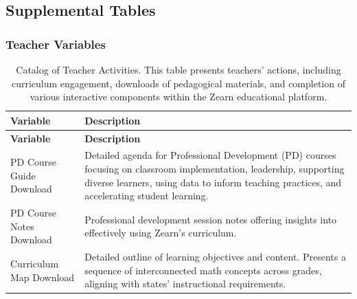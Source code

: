 \documentclass[
  number,
  preprint,
  3p,
  onecolumn]{elsarticle}
\begin{document}
\subsection{Supplemental Tables}\label{supplemental-tables}

\subsubsection{Teacher Variables}\label{teacher-variables}

\begin{longtable}[]{@{}
  >{\raggedright\arraybackslash}p{}
  >{\raggedright\arraybackslash}p{}@{}}
\caption{Catalog of Teacher Activities. This table presents teachers'
actions, including curriculum engagement, downloads of pedagogical
materials, and completion of various interactive components within the
Zearn educational platform.}\label{tbl-teacher-variables}\tabularnewline
\toprule\noalign{}
\begin{minipage}[b]{\linewidth}\raggedright
\textbf{Variable}
\end{minipage} & \begin{minipage}[b]{\linewidth}\raggedright
\textbf{Description}
\end{minipage} \\
\midrule\noalign{}
\endfirsthead
\toprule\noalign{}
\begin{minipage}[b]{\linewidth}\raggedright
\textbf{Variable}
\end{minipage} & \begin{minipage}[b]{\linewidth}\raggedright
\textbf{Description}
\end{minipage} \\
\midrule\noalign{}
\endhead
\bottomrule\noalign{}
\endlastfoot
PD Course Guide Download \citep{zearn2023, zearn2024c} & Detailed agenda
for Professional Development (PD) courses focusing on classroom
implementation, leadership, supporting diverse learners, using data to
inform teaching practices, and accelerating student learning. \\
PD Course Notes Download \citep{zearn2023, zearn2024c} & Professional
development session notes offering insights into effectively using
Zearn's curriculum. \\
Curriculum Map Download \citep{zearn2024d} & Detailed outline of
learning objectives and content. Presents a sequence of interconnected
math concepts across grades, aligning with states' instructional
requirements. \\

\end{longtable}
\end{document}
